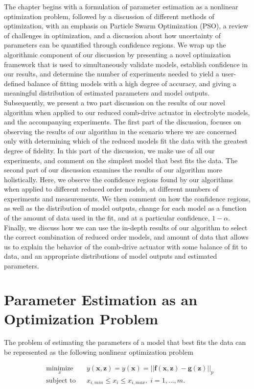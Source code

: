 The chapter begins with a formulation of parameter estimation as a nonlinear optimization problem, followed by a discussion of different methods of optimization, with an emphasis on Particle Swarm Optimization (PSO), a review of challenges in optimization, and a discussion about how uncertainty of parameters can be quantified through confidence regions. We wrap up the algorithmic component of our discussion by presenting a novel optimization framework that is used to simultaneously validate models, establish confidence in our results, and determine the number of experiments needed to yield a user-defined balance of fitting models with a high degree of accuracy, and giving a meaningful distribution of estimated parameters and model outputs. Subsequently, we present a two part discussion on the results of our novel algorithm when applied to our reduced comb-drive actuator in electrolyte models, and the accompanying experiments. The first part of the discussion, focuses on observing the results of our algorithm in the scenario where we are concerned only with determining which of the reduced models fit the data with the greatest degree of fidelity. In this part of the discussion, we make use of all our experiments, and comment on the simplest model that best fits the data. The second part of our discussion examines the results of our algorithm more holistically. Here, we observe the confidence regions found by our algorithms when applied to different reduced order models, at different numbers of experiments and measurements. We then comment on how the confidence regions, as well as the distribution of model outputs, change for each model as a function of the amount of data used in the fit, and at a particular confidence, $1-\alpha$. Finally, we discuss how we can use the in-depth results of our algorithm to select the correct combination of reduced order models, and amount of data that allows us to explain the behavior of the comb-drive actuator with some balance of fit to data, and an appropriate distributions of model outputs and estimated parameters. 

\section{Parameter Estimation as an Optimization Problem}
The problem of estimating the parameters of a model that best fits the data can be represented as the following nonlinear optimization problem

\begin{equation} \label{orig_optim_problm}
\begin{aligned}
& \underset{x}{\text{minimize}}
& & y(\mathbf{x},\mathbf{z}) = y(\mathbf{x}) = ||\mathbf{f}(\mathbf{x},\mathbf{z}) - \mathbf{g}(\mathbf{z})||_p \\
& \text{subject to}
& & x_{i,min} \leq x_i \leq x_{i,max} , \; i = 1, \ldots, m.
\end{aligned}
\end{equation}

